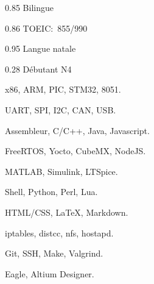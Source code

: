\documentclass{faresume}
\begin{document}
\begin{column}[\rightcolumnwidth]




		{}{}{}{}

		{}{}{}{}

		{}{}{}{}

		{}{}{}{}	


			{0.85}
			{Bilingue}
			{}{}{}

			{0.86}
			{TOEIC:~855/990}
			{}{}{}

			{0.95}
			{Langue natale}
			{}{}{}

			{0.28}
			{Débutant N4}
			{}{}{}


			{x86, ARM, PIC, STM32, 8051.}
			{}{}{}{}

			{UART, SPI, I2C, CAN, USB.}
			{}{}{}{}

			{Assembleur, C/C++, Java, Javascript.}
			{}{}{}{}
        
			{FreeRTOS, Yocto, CubeMX, NodeJS.}
			{}{}{}{}

			{MATLAB, Simulink, LTSpice.}
			{}{}{}{}

			{Shell, Python, Perl, Lua.}
			{}{}{}{}

			{HTML/CSS, {\LaTeX}, Markdown.}
			{}{}{}{}

			{iptables, distcc, nfs, hostapd.}
			{}{}{}{}

			{Git, SSH, Make, Valgrind.}
			{}{}{}{}
		
			{Eagle, Altium Designer.}
			{}{}{}{}


\end{column}
\end{document}
